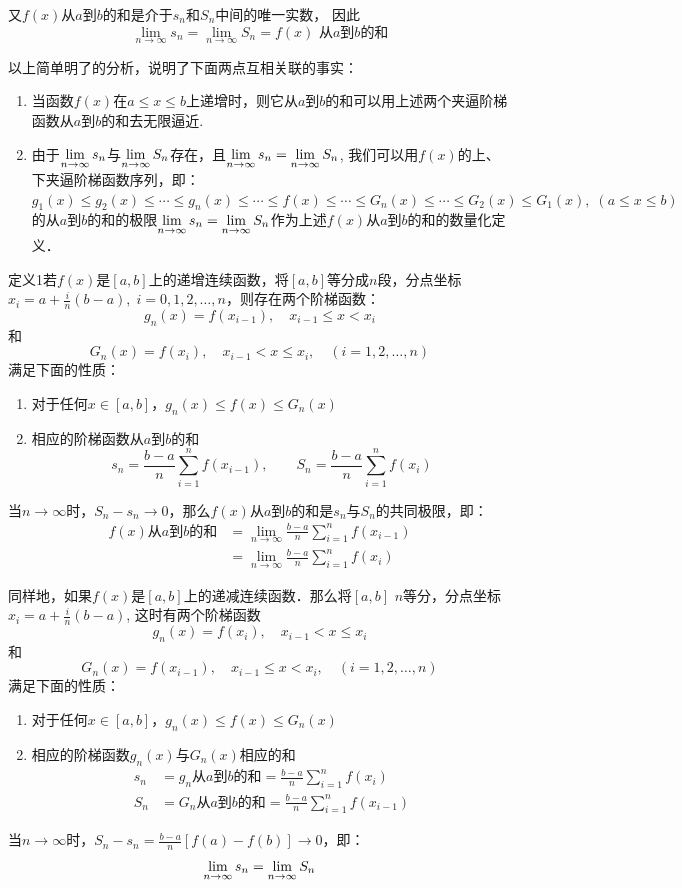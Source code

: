 \begin{solution}
又$f(x)$从$a$到$b$的和是介于$s_n$和$S_n$中间的唯一实数，
因此
\[\lim_{n\to\infty} s_n=\lim_{n\to\infty} S_n=f(x)\text{ 从$a$到$b$的和}\]

以上简单明了的分析，说明了下面两点互相关联的事实：
\begin{enumerate}
    \item 当函数$f(x)$在$a\le x\le b$上递增时，则它从$a$到$b$的和可以用上述两个夹逼阶梯函数从$a$到$b$的和去无限逼近.
    \item 由于$\displaystyle\lim_{n\to\infty}s_n$与$\displaystyle\lim_{n\to\infty}S_n$存在，且$\displaystyle\lim_{n\to\infty}s_n=\displaystyle\lim_{n\to\infty}S_n$, 我们可以用$f(x)$的上、下夹逼阶梯函数序列，即：$g_1 (x)\le g_2(x)\le \cdots\le g_n(x)\le \cdots\le f(x)\le \cdots\le G_n(x)\le \cdots\le G_2(x)\le G_1(x),\; (a\le x\le b)$的从$a$到$b$的和的极限$\displaystyle\lim_{n\to\infty}s_n=\displaystyle\lim_{n\to\infty}S_n$作为上述$f(x)$从$a$到$b$的和的数量化定义．
\end{enumerate}
\end{solution}

\begin{blk}
    {定义1}若$f(x)$是$[a,b]$上的递增连续函数，将$[a,b]$等分成$n$段，分点坐标$x_i=a+\frac{i}{n}(b-a),\; i=0,1, 2,\ldots,n$，则存在两个阶梯函数：
\[    g_n (x) =f (x_{i-1}) ,\quad x_{i-1}\le  x< x_i\]
    和
\[    G_n (x)=f(x_i),\quad x_{i-1}<x\le x_i,\quad (i=1,2,\ldots,n)\]
满足下面的性质：
\begin{enumerate}
    \item 对于任何$x\in[a,b]$，$g_n(x)\le f(x)\le G_n(x)$
    \item 相应的阶梯函数从$a$到$b$的和
\[s_n=\frac{b-a}{n}\sum^n_{i=1}f(x_{i-1}),\qquad S_n=\frac{b-a}{n}\sum^n_{i=1}f(x_{i})  \]
\end{enumerate}
当$n\to\infty$时，$S_n-s_n\to 0$，那么$f(x)$从$a$到$b$的和是$s_n$与$S_n$的共同极限，即：
\begin{align*}
f(x)\text{从$a$到$b$的和}&=\lim_{n\to\infty}\frac{b-a}{n}\sum^n_{i=1}f(x_{i-1})\\
&=\lim_{n\to\infty}\frac{b-a}{n}\sum^n_{i=1}f(x_{i})
\end{align*}

同样地，如果$f(x)$是$[a,b]$上的递减连续函数．那么将$[a,b]$ $n$等分，分点坐标$x_i=a+\frac{i}{n}(b-a)$, 这时有两个阶梯函数
\[    g_n (x) =f (x_{i}) ,\quad x_{i-1}<  x\le x_i\]
    和
\[    G_n (x)=f(x_{i-1}),\quad x_{i-1}\le x< x_i,\quad (i=1,2,\ldots,n)\]
满足下面的性质：
\begin{enumerate}
    \item 对于任何$x\in[a,b]$，$g_n(x)\le f(x)\le G_n(x)$
    \item 相应的阶梯函数$g_n(x)$与$G_n(x)$相应的和
\begin{align*}
    s_n&=g_n\text{从$a$到$b$的和}=\frac{b-a}{n}\sum^n_{i=1}f(x_{i})\\
    S_n&=G_n\text{从$a$到$b$的和}=\frac{b-a}{n}\sum^n_{i=1}f(x_{i-1})  
\end{align*}
\end{enumerate}
当$n\to\infty$时，$S_n-s_n=\frac{b-a}{n}\left[f(a)-f(b)\right]\to 0$，即：
\[\displaystyle\lim_{n\to\infty}s_n=\displaystyle\lim_{n\to\infty}S_n\]
\end{blk}

